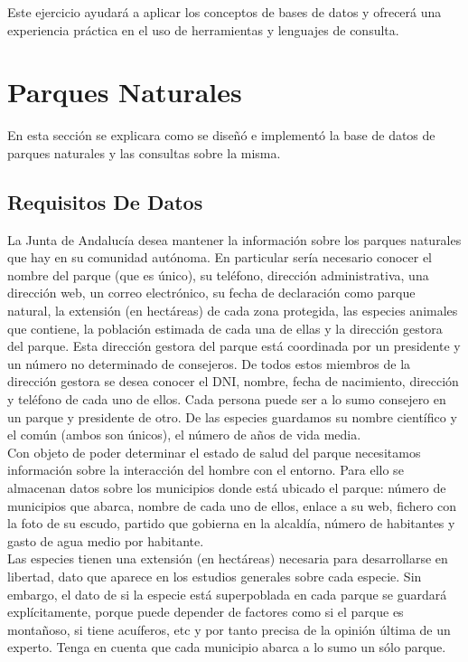 \documentclass{article}
\begin{document}
Este ejercicio ayudará a aplicar los conceptos de bases de datos y ofrecerá una experiencia práctica en el uso de herramientas y lenguajes de consulta.



\section{Parques Naturales}

En esta sección se explicara como se diseñó e implementó la base de datos de parques naturales y las consultas sobre la misma.

\subsection{Requisitos De Datos}

La Junta de Andalucía desea mantener la información sobre los parques naturales que hay en su comunidad autónoma. En particular sería necesario conocer el nombre del parque (que es único), su teléfono, dirección administrativa, una dirección web, un correo electrónico, su fecha de declaración como parque natural, la extensión (en hectáreas) de cada zona protegida, las especies animales que contiene, la población estimada de cada una de ellas y la dirección gestora del parque. Esta dirección gestora del parque está coordinada por un presidente y un número no determinado de consejeros. De todos estos miembros de la dirección gestora se desea conocer el DNI, nombre, fecha de nacimiento, dirección y teléfono de cada uno de ellos. Cada persona puede ser a lo sumo consejero en un parque y presidente de otro. De las especies guardamos su nombre científico y el común (ambos son únicos), el número de años de vida media. 
\\

Con objeto de poder determinar el estado de salud del parque necesitamos información sobre la interacción del hombre con el entorno. Para ello se almacenan datos sobre los municipios donde está ubicado el parque: número de municipios que abarca, nombre de cada uno de ellos, enlace a su web, fichero con la foto de su escudo, partido que gobierna en la alcaldía, número de habitantes y gasto de agua medio por habitante. 
\\

Las especies tienen una extensión (en hectáreas) necesaria para desarrollarse en libertad, dato que aparece en los estudios generales sobre cada especie. Sin embargo, el dato de si la especie está superpoblada en cada parque se guardará explícitamente, porque puede depender de factores como si el parque es montañoso, si tiene acuíferos, etc y por tanto precisa de la opinión última de un experto. Tenga en cuenta que cada municipio abarca a lo sumo un sólo parque. 
\end{document}
